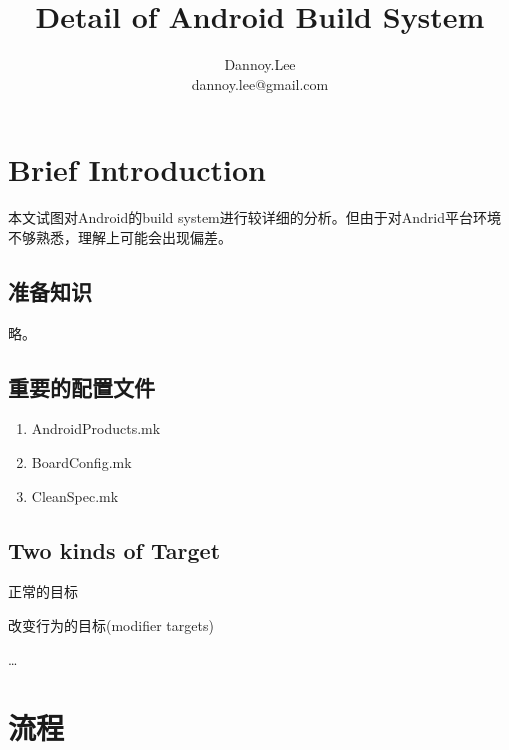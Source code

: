 \documentclass[a4paper,11pt]{article}
\author{Dannoy.Lee \\
    dannoy.lee@gmail.com}
\title{Detail of Android Build System}
\begin{document}
\begin{CJK*}{UTF8}{gbsn}
\maketitle

\tableofcontents
\newpage

\section{Brief Introduction}
本文试图对Android的build system进行较详细的分析。但由于对Andrid平台环境不够熟悉，理解上可能会出现偏差。
\subsection{准备知识}
略。
\subsection{重要的配置文件}
\begin{enumerate}
    \item AndroidProducts.mk \\
    \item BoardConfig.mk \\
    \item CleanSpec.mk \\
\end{enumerate} 
\subsection{Two kinds of Target}
\begin{description}
    \item 正常的目标 \\
    \item 改变行为的目标(modifier targets) \\
\end{description} 
\ldots{}

\section{流程}

\end{CJK*}
\end{document}
